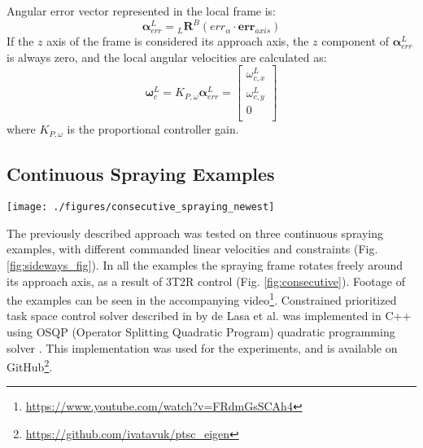 Angular error vector represented in the local frame is:
\begin{equation}
\boldsymbol{\alpha}^L_{err} = {}_L\boldsymbol{R}^B(err_{\alpha} \cdot \boldsymbol{err}_{axis})
\end{equation}
If the $z$ axis of the frame is considered its approach axis, the $z$ component of $\boldsymbol{\alpha}^L_{err}$ is always zero, and the local angular velocities are calculated as:
\begin{equation}
\boldsymbol{\omega}^L_{c} = K_{P,\omega}\boldsymbol{\alpha}^L_{err} = 
\begin{bmatrix}
    \omega^L_{c,x} \\
    \omega^L_{c,y} \\
    0 \\
\end{bmatrix}
\end{equation}
where $K_{P,\omega}$ is the proportional controller gain.



\subsection{Continuous Spraying Examples}
\begin{figure*}[!ht]
\centering
\texttt{[image: ./figures/consecutive\_spraying\_newest]}
\caption{
	Spraying frame rotates freely around its approach axis while minimizing the 3T2R task as well as joint movement. 
}
\label{fig:consecutive}
\end{figure*}
The previously described approach was tested on three continuous spraying examples, with different commanded linear velocities and constraints (Fig. \ref{fig:sideways_fig}). In all the examples the spraying frame rotates freely around its approach axis, as a result of 3T2R control (Fig. \ref{fig:consecutive}). Footage of the examples can be seen in the accompanying video\footnote{\url{https://www.youtube.com/watch?v=FRdmGsSCAh4}}. Constrained prioritized task space control solver described in \cite{deLasa2010} by de Lasa et al. was implemented in C++ using OSQP (Operator Splitting Quadratic Program) quadratic programming solver \cite{osqp}. This implementation was used for the experiments, and is available on GitHub\footnote{\url{https://github.com/ivatavuk/ptsc_eigen}}.


